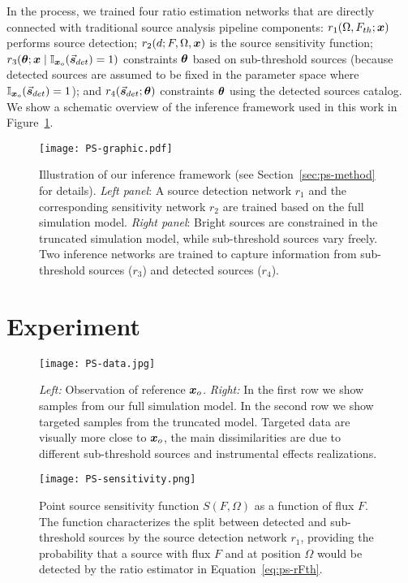 In the process, we trained four ratio estimation networks that are directly connected with traditional source analysis pipeline components: $ r_1(\Omega, F_{th}; \bm{x})$ performs source detection; $r_2(d; F, \Omega, \bm{x})$ is the source sensitivity function; $ r_3(\bm{\theta}; \bm{x}\mid \mathbb{I}_{\bm{x}_o}(\vec{\boldsymbol{s}}_{det})=1)$ constraints $\bm{\theta}$ based on sub-threshold sources (because detected sources are assumed to be fixed in the parameter space where $\mathbb{I}_{\bm{x}_o}(\vec{\boldsymbol{s}}_{det})=1$); and $r_4(\vec{\boldsymbol{s}}_{det}; \bm{\theta})$ constraints $\bm{\theta}$ using the detected sources catalog.
We show a schematic overview of the inference framework used in this work in Figure~\ref{fig:ps-graphic}.

\begin{figure}
    \centering
    \texttt{[image: PS-graphic.pdf]}
    \caption{Illustration of our inference framework (see Section~\ref{sec:ps-method} for details). \textit{Left panel}: A source detection network $r_1$ and the corresponding sensitivity network $r_2$ are trained based on the full simulation model. \textit{Right panel}: Bright sources are constrained in the truncated simulation model, while sub-threshold sources vary freely.  Two inference networks are trained to capture information from sub-threshold sources ($r_3$) and detected sources ($r_4$).
    }
    \label{fig:ps-graphic}
\end{figure}


\section{Experiment}
\label{sec:ps-results}

\begin{figure}
    \centering
    \texttt{[image: PS-data.jpg]}
    \caption{
      \textit{Left:} Observation of reference $\bm{x}_o$. 
      \textit{Right:} In the first row we show samples from our full simulation model. In the second row we show targeted samples from the truncated model. Targeted data are visually more close to $\bm{x}_o$, the main dissimilarities are due to different sub-threshold sources and instrumental effects realizations.
    }
    \label{fig:ps-data}
\end{figure}

\begin{figure}
    \centering
    \texttt{[image: PS-sensitivity.png]}
    \caption{Point source sensitivity function $S(F, \Omega)$ as a function of flux $F$. The function characterizes the split between detected and sub-threshold sources by the source detection network $r_1$, providing the probability that a source with flux $F$ and at position $\Omega$ would be detected by the ratio estimator in Equation~\eqref{eq:ps-rFth}.  
    }
    \label{fig:ps-sensitivity}
\end{figure}

